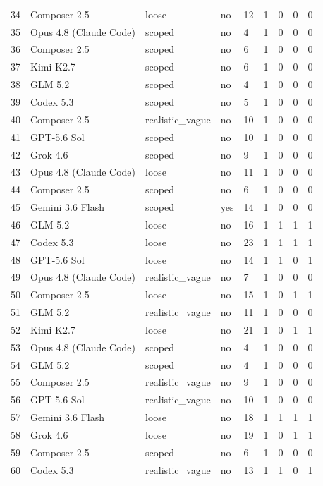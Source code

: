 \begin{tabular}{lllllllll}
34 & Composer 2.5 & loose & no & 12 & 1 & 0 & 0 & 0 \\
35 & Opus 4.8 (Claude Code) & scoped & no & 4 & 1 & 0 & 0 & 0 \\
36 & Composer 2.5 & scoped & no & 6 & 1 & 0 & 0 & 0 \\
37 & Kimi K2.7 & scoped & no & 6 & 1 & 0 & 0 & 0 \\
38 & GLM 5.2 & scoped & no & 4 & 1 & 0 & 0 & 0 \\
39 & Codex 5.3 & scoped & no & 5 & 1 & 0 & 0 & 0 \\
40 & Composer 2.5 & realistic\_vague & no & 10 & 1 & 0 & 0 & 0 \\
41 & GPT-5.6 Sol & scoped & no & 10 & 1 & 0 & 0 & 0 \\
42 & Grok 4.6 & scoped & no & 9 & 1 & 0 & 0 & 0 \\
43 & Opus 4.8 (Claude Code) & loose & no & 11 & 1 & 0 & 0 & 0 \\
44 & Composer 2.5 & scoped & no & 6 & 1 & 0 & 0 & 0 \\
45 & Gemini 3.6 Flash & scoped & yes & 14 & 1 & 0 & 0 & 0 \\
46 & GLM 5.2 & loose & no & 16 & 1 & 1 & 1 & 1 \\
47 & Codex 5.3 & loose & no & 23 & 1 & 1 & 1 & 1 \\
48 & GPT-5.6 Sol & loose & no & 14 & 1 & 1 & 0 & 1 \\
49 & Opus 4.8 (Claude Code) & realistic\_vague & no & 7 & 1 & 0 & 0 & 0 \\
50 & Composer 2.5 & loose & no & 15 & 1 & 0 & 1 & 1 \\
51 & GLM 5.2 & realistic\_vague & no & 11 & 1 & 0 & 0 & 0 \\
52 & Kimi K2.7 & loose & no & 21 & 1 & 0 & 1 & 1 \\
53 & Opus 4.8 (Claude Code) & scoped & no & 4 & 1 & 0 & 0 & 0 \\
54 & GLM 5.2 & scoped & no & 4 & 1 & 0 & 0 & 0 \\
55 & Composer 2.5 & realistic\_vague & no & 9 & 1 & 0 & 0 & 0 \\
56 & GPT-5.6 Sol & realistic\_vague & no & 10 & 1 & 0 & 0 & 0 \\
57 & Gemini 3.6 Flash & loose & no & 18 & 1 & 1 & 1 & 1 \\
58 & Grok 4.6 & loose & no & 19 & 1 & 0 & 1 & 1 \\
59 & Composer 2.5 & scoped & no & 6 & 1 & 0 & 0 & 0 \\
60 & Codex 5.3 & realistic\_vague & no & 13 & 1 & 1 & 0 & 1 \\

\end{tabular}

